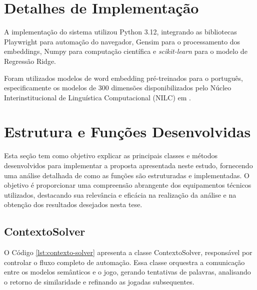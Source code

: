 \section{Detalhes de Implementação}
A implementação do sistema utilizou Python 3.12, integrando as bibliotecas Playwright para automação do navegador, Gensim para o processamento dos embeddings, Numpy para computação científica e \textit{scikit-learn} para o modelo de Regressão Ridge.

Foram utilizados modelos de word embedding pré-treinados para o português, especificamente os modelos de 300 dimensões disponibilizados pelo Núcleo Interinstitucional de Linguística Computacional (NILC) em .

\section{Estrutura e Funções Desenvolvidas}
Esta seção tem como objetivo explicar as principais classes e métodos desenvolvidos para
implementar a proposta apresentada neste estudo, fornecendo uma análise detalhada
de como as funções são estruturadas e implementadas. O objetivo é proporcionar uma
compreensão abrangente dos equipamentos técnicos utilizados, destacando sua relevância
e eficácia na realização da análise e na obtenção dos resultados desejados nesta tese.

\subsection{ContextoSolver}
O Código \ref{lst:contexto-solver} apresenta a classe ContextoSolver, responsável por controlar o fluxo completo de automação. Essa classe orquestra a comunicação entre os modelos semânticos e o jogo, gerando tentativas de palavras, analisando o retorno de similaridade e refinando as jogadas subsequentes.

